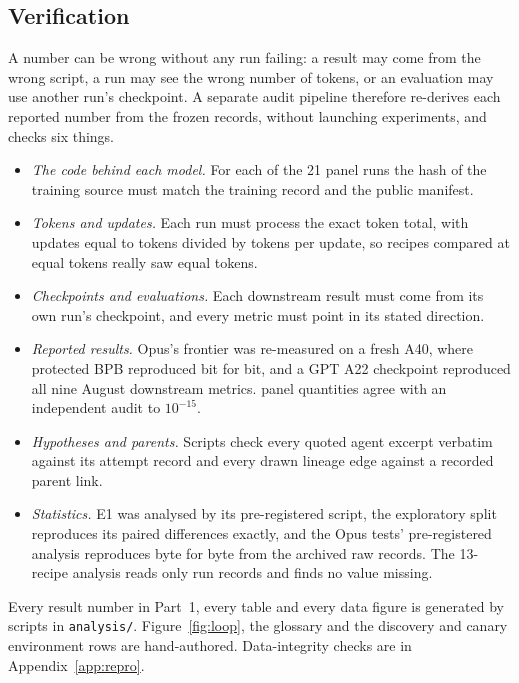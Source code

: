 \documentclass{article}
\newif\ifshowhumanmarkers \showhumanmarkersfalse
\newcommand{\humantag}[1]{{\color{humanframe}\sffamily\scriptsize\bfseries HUMAN AUTHOR MUST REWRITE/VERIFY [#1]}\ }
\newcommand{\humanauthor}[2][]{\ifshowhumanmarkers\begin{humanbox}\humantag{#1}#2\end{humanbox}\else #2\par\fi}
\begin{document}
\subsection{Verification}\label{sec:verification}
\humanauthor[P2-07 r6]{ A number can be wrong without any run failing: a result may come from the wrong script, a run may see the wrong number of tokens, or an evaluation may use another run's checkpoint. A separate audit pipeline therefore re-derives each reported number from the frozen records, without launching experiments, and checks six things.
{\setlength{\leftmargini}{1.2em}\begin{itemize}\setlength{\itemsep}{0pt}\setlength{\parskip}{0pt}\setlength{\topsep}{1pt}
\item \emph{The code behind each model.} For each of the 21 panel runs the hash of the training source must match the training record and the public manifest.
\item \emph{Tokens and updates.} Each run must process the exact token total, with updates equal to tokens divided by tokens per update, so recipes compared at equal tokens really saw equal tokens.
\item \emph{Checkpoints and evaluations.} Each downstream result must come from its own run's checkpoint, and every metric must point in its stated direction.
\item \emph{Reported results.} Opus's frontier was re-measured on a fresh A40, where protected BPB reproduced bit for bit, and a GPT A22 checkpoint reproduced all nine August downstream metrics. \CRNCrossChecked{} panel quantities agree with an independent audit to $10^{-15}$.
\item \emph{Hypotheses and parents.} Scripts check every quoted agent excerpt verbatim against its attempt record and every drawn lineage edge against a recorded parent link.
\item \emph{Statistics.} E1 was analysed by its pre-registered script, the exploratory split reproduces its paired differences exactly, and the Opus tests' pre-registered analysis reproduces byte for byte from the archived raw records. The 13-recipe analysis reads only run records and finds no value missing.
\end{itemize}}
\looseness=-1 Every result number in Part~1, every table and every data figure is generated by scripts in \texttt{analysis/}. Figure~\ref{fig:loop}, the glossary and the discovery and canary environment rows are hand-authored. Data-integrity checks are in Appendix~\ref{app:repro}.}
\end{document}
